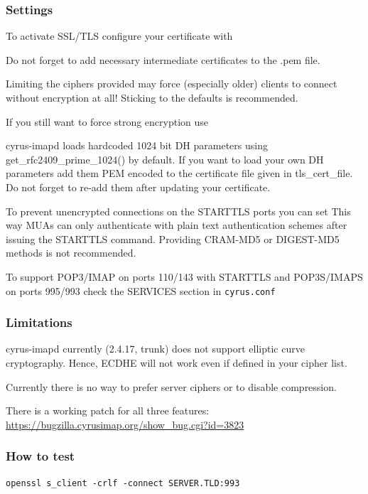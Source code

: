 \subsubsection{Settings}

To activate SSL/TLS configure your certificate with

Do not forget to add necessary intermediate certificates to the .pem file.

Limiting the ciphers provided may force (especially older) clients to connect without encryption at all! Sticking to the defaults is recommended.

If you still want to force strong encryption use

cyrus-imapd loads hardcoded 1024 bit DH parameters using get\_rfc2409\_prime\_1024() by default. If you want to load your own DH parameters add them PEM encoded to the certificate file given in tls\_cert\_file. Do not forget to re-add them after updating your certificate.

To prevent unencrypted connections on the STARTTLS ports you can set
This way MUAs can only authenticate with plain text authentication schemes after issuing the STARTTLS command. Providing CRAM-MD5 or DIGEST-MD5 methods is not recommended.

To support POP3/IMAP on ports 110/143 with STARTTLS and POP3S/IMAPS on ports
995/993 check the SERVICES section in \texttt{cyrus.conf}


\subsubsection{Limitations}
cyrus-imapd currently (2.4.17, trunk) does not support elliptic curve cryptography. Hence, ECDHE will not work even if defined in your cipher list.

Currently there is no way to prefer server ciphers or to disable compression.

There is a working patch for all three features:
\url{https://bugzilla.cyrusimap.org/show_bug.cgi?id=3823}

\subsubsection{How to test}
\begin{lstlisting}
openssl s_client -crlf -connect SERVER.TLD:993
\end{lstlisting}

